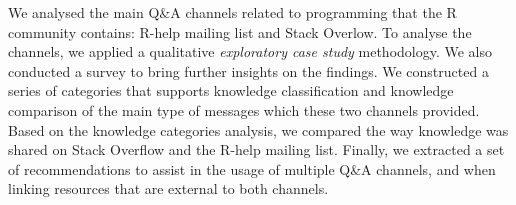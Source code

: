 \documentclass{sig-alternate-05-2015}
\begin{document}
We analysed the main Q\&A channels related to programming that the R community contains: R-help mailing list and Stack Overlow.
To analyse the channels, we applied a qualitative \textit{exploratory case study} methodology.
We also conducted a survey to bring further insights on the findings.
We constructed a series of categories that supports knowledge classification and knowledge comparison of the main type of messages which these two channels provided.
Based on the knowledge categories analysis, we compared the way knowledge was shared on Stack Overflow and the R-help mailing list.
Finally, we extracted a set of recommendations to assist in the usage of multiple Q\&A channels, and when linking resources that are external to both channels.



\end{document}
